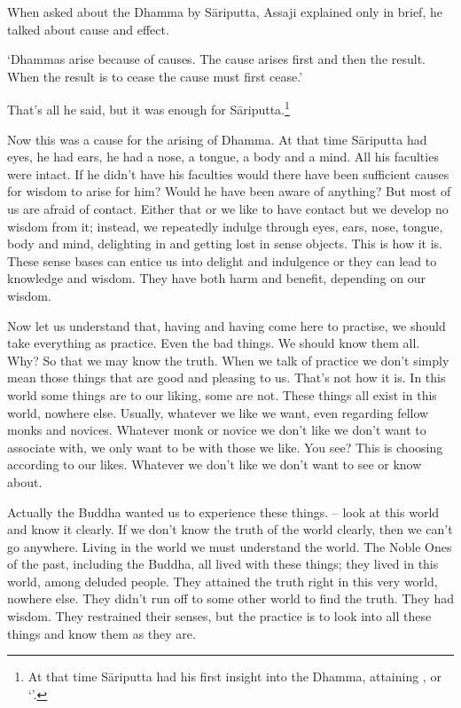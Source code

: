 When asked about the Dhamma by S\=ariputta, Assaji explained only in brief, he talked about cause and effect.

`Dhammas arise because of causes. The cause arises first and then the result. When the result is to cease the cause must first cease.'

That's all he said, but it was enough for S\=ariputta.\footnote{At that time S\=ariputta had his first insight into the Dhamma, attaining , or `'.}

Now this was a cause for the arising of Dhamma. At that time S\=ariputta had eyes, he had ears, he had a nose, a tongue, a body and a mind. All his faculties were intact. If he didn't have his faculties would there have been sufficient causes for wisdom to arise for him? Would he have been aware of anything? But most of us are afraid of contact. Either that or we like to have contact but we develop no wisdom from it; instead, we repeatedly indulge through eyes, ears, nose, tongue, body and mind, delighting in and getting lost in sense objects. This is how it is. These sense bases can entice us into delight and indulgence or they can lead to knowledge and wisdom. They have both harm and benefit, depending on our wisdom.

Now let us understand that, having  and having come here to practise, we should take everything as practice. Even the bad things. We should know them all. Why? So that we may know the truth. When we talk of practice we don't simply mean those things that are good and pleasing to us. That's not how it is. In this world some things are to our liking, some are not. These things all exist in this world, nowhere else. Usually, whatever we like we want, even regarding fellow monks and novices. Whatever monk or novice we don't like we don't want to associate with, we only want to be with those we like. You see? This is choosing according to our likes. Whatever we don't like we don't want to see or know about.

Actually the Buddha wanted us to experience these things.  -- look at this world and know it clearly. If we don't know the truth of the world clearly, then we can't go anywhere. Living in the world we must understand the world. The Noble Ones of the past, including the Buddha, all lived with these things; they lived in this world, among deluded people. They attained the truth right in this very world, nowhere else. They didn't run off to some other world to find the truth. They had wisdom. They restrained their senses, but the practice is to look into all these things and know them as they are.

